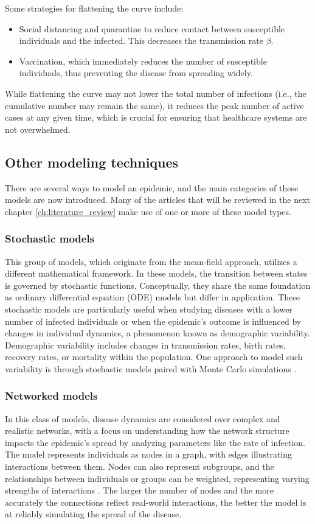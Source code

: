 Some strategies for flattening the curve include:
\begin{itemize}
	\item Social distancing and quarantine to reduce contact between susceptible individuals and the infected. This decreases the transmission rate $\beta$.
	\item Vaccination, which immediately reduces the number of susceptible individuals, thus preventing the disease from spreading widely.
\end{itemize}
While flattening the curve may not lower the total number of infections (i.e., the cumulative number may remain the same), it reduces the peak number of active cases at any given time, which is crucial for ensuring that healthcare systems are not overwhelmed.


\subsection{Other modeling techniques}
There are several ways to model an epidemic, and the main categories of these models are now introduced. Many of the articles that will be reviewed in the next chapter \ref{ch:literature_review} make use of one or more of these model types.
\subsubsection{Stochastic models} 	
This group of models, which originate from the mean-field approach, utilizes a different mathematical framework. In these models, the transition between states is governed by stochastic functions. Conceptually, they share the same foundation as ordinary differential equation (ODE) models but differ in application. These stochastic models are particularly useful when studying diseases with a lower number of infected individuals or when the epidemic's outcome is influenced by changes in individual dynamics, a phenomenon known as demographic variability. Demographic variability includes changes in transmission rates, birth rates, recovery rates, or mortality within the population.
One approach to model such variability is through stochastic models paired with Monte Carlo simulations \cite{Allen2017}.

\subsubsection{Networked models}
In this class of models, disease dynamics are considered over complex and realistic networks, with a focus on understanding how the network structure impacts the epidemic's spread by analyzing parameters like the rate of infection. The model represents individuals as nodes in a graph, with edges illustrating interactions between them. Nodes can also represent subgroups, and the relationships between individuals or groups can be weighted, representing varying strengths of interactions \cite{Newman2002,VanMieghem2009}. The larger the number of nodes and the more accurately the connections reflect real-world interactions, the better the model is at reliably simulating the spread of the disease.



